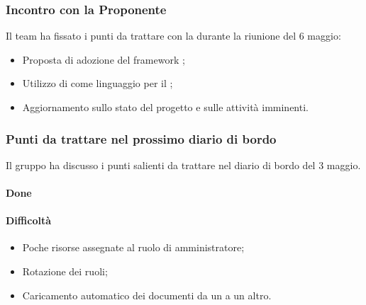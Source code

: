 \subsubsection{Incontro con la Proponente}
\par Il team ha fissato i punti da trattare con la  durante la riunione del 6 maggio:
\begin{itemize}
	\item Proposta di adozione del framework ;
	\item Utilizzo di  come linguaggio per il ;
	\item Aggiornamento sullo stato del progetto e sulle attività imminenti.
\end{itemize}

\subsubsection{Punti da trattare nel prossimo diario di bordo}
\par Il gruppo ha discusso i punti salienti da trattare nel diario di bordo del 3 maggio.

\paragraph{Done}

\paragraph{Difficoltà}
\begin{itemize}
	\item Poche risorse assegnate al ruolo di amministratore;
	\item Rotazione dei ruoli;
	\item Caricamento automatico dei documenti da un  a un altro.
\end{itemize}	


